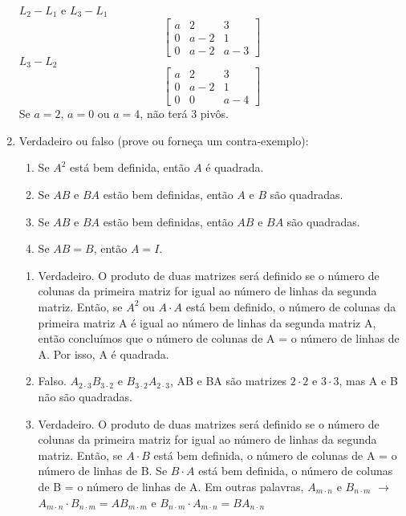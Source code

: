 \documentclass[leqno]{article}
\begin{document}
\begin{enumerate}
		\begin{sol} 
			$L_2 - L_1$ e $L_3 - L_1$
			$$\begin{bmatrix} 
				a & 2 & 3  \\
				0 & a-2 & 1  \\
				0 & a-2 & a-3 
			\end{bmatrix}$$
			$L_3 - L_2$
			$$\begin{bmatrix} 
				a & 2 & 3  \\
				0 & a-2 & 1  \\
				0 & 0 & a-4 
			\end{bmatrix}$$
		Se $a = 2$, $a = 0$ ou $a = 4$, não terá 3 pivôs.
			               
		\end{sol} 
		
		\item Verdadeiro ou falso (prove ou forneça um contra-exemplo):
		
		\begin{enumerate}
			
			\item Se $A^2$ está bem definida, então $A$ é quadrada.
			
			\item Se $AB$ e $BA$ estão bem definidas, então $A$ e $B$ são quadradas.
			
			\item Se $AB$ e $BA$ estão bem definidas, então $AB$ e $BA$ são quadradas.
			
			\item Se $AB = B$, então $A = I$.
			
		\end{enumerate}
		
		\begin{sol} 
			\begin{enumerate} 
				\item Verdadeiro. O produto de duas matrizes será definido se o número de colunas da primeira matriz for igual ao número de linhas da segunda matriz. Então, se $A^2$ ou $A \cdot A$ está bem definido, o número de colunas da primeira matriz A é igual ao número de linhas da segunda matriz A, então concluímos que o número de colunas de A = o número de linhas de A. Por isso, A é quadrada.
				
				\item Falso. $A_{2 \cdot 3}B_{3 \cdot 2}$ e $B_{3 \cdot 2}A_{2 \cdot 3}$, AB e BA são matrizes $2 \cdot 2$ e $3 \cdot 3$, mas A e B não são quadradas.
				
				\item Verdadeiro. O produto de duas matrizes será definido se o número de colunas da primeira matriz for igual ao número de linhas da segunda matriz. Então, se $A \cdot B$ está bem definida, o número de colunas de A = o número de linhas de B.
				Se  $B \cdot A$ está bem definida, o número de colunas de B = o número de linhas de A. Em outras palavras, $A_{m \cdot n}$ e $B_{n \cdot m}$ $\rightarrow$ $A_{m \cdot n} \cdot B_{n \cdot m} = AB_{m \cdot m}$ e $B_{n \cdot m} \cdot A_{m \cdot n} = BA_{n \cdot n}$
				

\end{enumerate}
\end{sol}
\end{enumerate}
\end{document}
